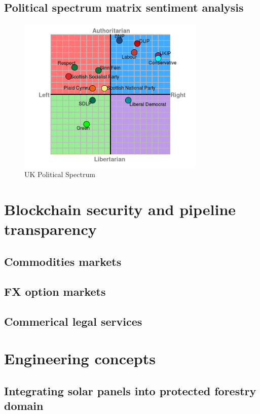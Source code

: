 \documentclass[11pt]{article}
\begin{document}
\subsection{Political spectrum matrix sentiment analysis}
\begin{figure}[h!]
	\centering
	\includegraphics[width=0.8\textwidth]{uk2010.png}
	\caption{UK Political Spectrum}
	\label{fig:UKCompass}
\end{figure}
\newpage
\section{Blockchain security and pipeline transparency}
\subsection{Commodities markets}
\subsection{FX option markets}
\subsection{Commerical legal services}

\section{Engineering concepts}
\subsection{Integrating solar panels into protected forestry domain}

\newpage
\printbibliography
{}
\end{document}

